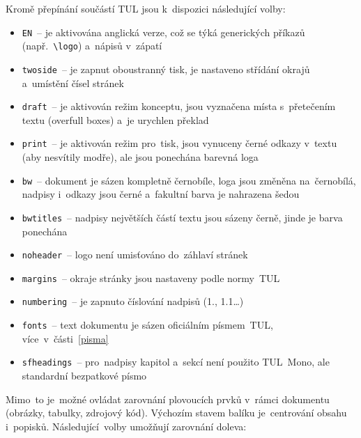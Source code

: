 \documentclass[a4paper,12pt,fonts,numbering,listingsleft]{./tulpackage/tularticle}
\makeatletter
\newcommand{\cmdfont}[1]{\texttt{\color{\tulcolor}#1}}
\newcommand{\cmdnoindex}[1]{\cmdfont{\textbackslash{}#1}}
\newcommand{\cmd}[1]{\cmdnoindex{#1}\index{#1@\textbackslash #1}}
\makeatother
\begin{document}
Kromě přepínání součástí TUL jsou k~dispozici následující volby:

\bigskip

\begin{itemize}[label={}, leftmargin=0pt]
    \raggedright%
    \item \cmdfont{EN}~-- je aktivována anglická verze, což se týká generických příkazů
          (např.~\cmd{logo}) a~nápisů v~zápatí
    \item \cmdfont{twoside}~-- je zapnut oboustranný tisk, je nastaveno střídání
    okrajů a~umístění čísel stránek
    \item \cmdfont{draft}~-- je aktivován režim konceptu, jsou vyznačena místa
    s~přetečením textu (overfull boxes) a~je urychlen překlad
    \item \cmdfont{print}~-- je aktivován režim pro~tisk, jsou vynuceny černé odkazy
    v~textu (aby nesvítily modře), ale jsou ponechána barevná loga
    \item \cmdfont{bw}~-- dokument je sázen kompletně černobíle, loga jsou změněna
    na~černobílá, nadpisy i~odkazy jsou černé a~fakultní barva je nahrazena šedou
    \item \cmdfont{bwtitles}~-- nadpisy největších částí textu jsou sázeny černě,
    jinde je barva ponechána
    \item \cmdfont{noheader}~-- logo není umisťováno do~záhlaví stránek
    \item \cmdfont{margins}~-- okraje stránky jsou nastaveny podle normy~TUL
    \item \cmdfont{numbering}~-- je zapnuto číslování nadpisů (1., 1.1\dots)
    \item \cmdfont{fonts}~-- text dokumentu je sázen oficiálním písmem~TUL,
          více~v~části~\ref{pisma}
    \item \cmdfont{sfheadings}~-- pro~nadpisy kapitol a~sekcí není použito TUL~Mono,
    ale standardní bezpatkové písmo
\end{itemize}

\clearpage

Mimo~to je~možné ovládat zarovnání plovoucích prvků v~rámci dokumentu
(obrázky, tabulky, zdrojový kód).
Výchozím stavem balíku je~centrování obsahu i~popisků.
Následující~volby umožňují zarovnání doleva:

\bigskip
\end{document}
